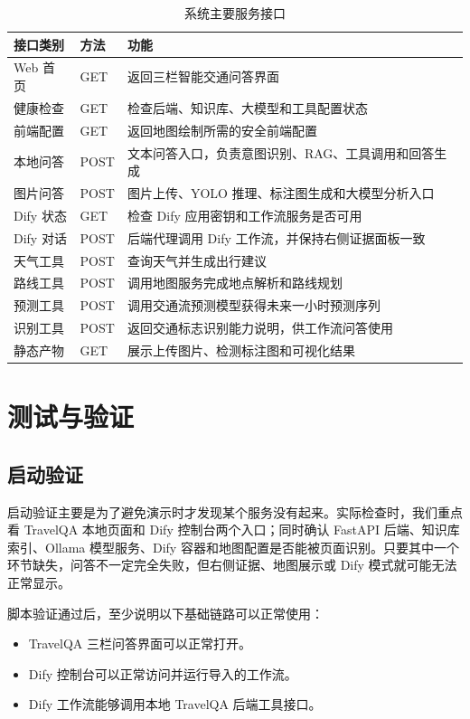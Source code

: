 \documentclass[bwprint]{report}
\begin{document}
\begin{table}[H]
    \caption{系统主要服务接口}
    \label{tab:api-list}
    \centering
    \small
    \begin{tabular}{p{}p{}p{}}
        \toprule[1.5pt]
        接口类别 & 方法 & 功能 \\
        \midrule[1pt]
        Web 首页 & GET & 返回三栏智能交通问答界面 \\
        健康检查 & GET & 检查后端、知识库、大模型和工具配置状态 \\
        前端配置 & GET & 返回地图绘制所需的安全前端配置 \\
        本地问答 & POST & 文本问答入口，负责意图识别、RAG、工具调用和回答生成 \\
        图片问答 & POST & 图片上传、YOLO 推理、标注图生成和大模型分析入口 \\
        Dify 状态 & GET & 检查 Dify 应用密钥和工作流服务是否可用 \\
        Dify 对话 & POST & 后端代理调用 Dify 工作流，并保持右侧证据面板一致 \\
        天气工具 & POST & 查询天气并生成出行建议 \\
        路线工具 & POST & 调用地图服务完成地点解析和路线规划 \\
        预测工具 & POST & 调用交通流预测模型获得未来一小时预测序列 \\
        识别工具 & POST & 返回交通标志识别能力说明，供工作流问答使用 \\
        静态产物 & GET & 展示上传图片、检测标注图和可视化结果 \\
        \bottomrule[1.5pt]
    \end{tabular}
\end{table}

\section{测试与验证}
\subsection{启动验证}
启动验证主要是为了避免演示时才发现某个服务没有起来。实际检查时，我们重点看 TravelQA 本地页面和 Dify 控制台两个入口；同时确认 FastAPI 后端、知识库索引、Ollama 模型服务、Dify 容器和地图配置是否能被页面识别。只要其中一个环节缺失，问答不一定完全失败，但右侧证据、地图展示或 Dify 模式就可能无法正常显示。

脚本验证通过后，至少说明以下基础链路可以正常使用：
\begin{itemize}
    \item TravelQA 三栏问答界面可以正常打开。
    \item Dify 控制台可以正常访问并运行导入的工作流。
    \item Dify 工作流能够调用本地 TravelQA 后端工具接口。
\end{itemize}
\end{document}
